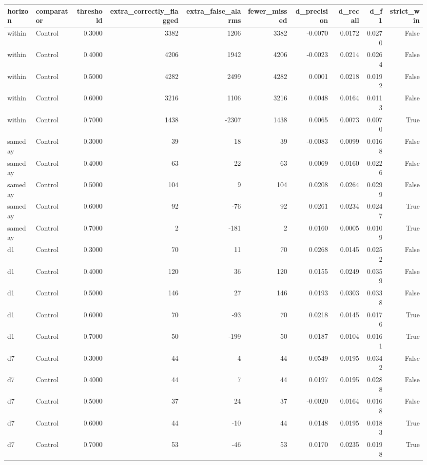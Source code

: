 \begin{tabular}{llrrrrrrrr}
\toprule
horizon & comparator & threshold & extra\_correctly\_flagged & extra\_false\_alarms & fewer\_missed & d\_precision & d\_recall & d\_f1 & strict\_win \\
\midrule
within & Control & 0.3000 & 3382 & 1206 & 3382 & -0.0070 & 0.0172 & 0.0270 & False \\
within & Control & 0.4000 & 4206 & 1942 & 4206 & -0.0023 & 0.0214 & 0.0264 & False \\
within & Control & 0.5000 & 4282 & 2499 & 4282 & 0.0001 & 0.0218 & 0.0192 & False \\
within & Control & 0.6000 & 3216 & 1106 & 3216 & 0.0048 & 0.0164 & 0.0113 & False \\
within & Control & 0.7000 & 1438 & -2307 & 1438 & 0.0065 & 0.0073 & 0.0070 & True \\
sameday & Control & 0.3000 & 39 & 18 & 39 & -0.0083 & 0.0099 & 0.0168 & False \\
sameday & Control & 0.4000 & 63 & 22 & 63 & 0.0069 & 0.0160 & 0.0226 & False \\
sameday & Control & 0.5000 & 104 & 9 & 104 & 0.0208 & 0.0264 & 0.0299 & False \\
sameday & Control & 0.6000 & 92 & -76 & 92 & 0.0261 & 0.0234 & 0.0247 & True \\
sameday & Control & 0.7000 & 2 & -181 & 2 & 0.0160 & 0.0005 & 0.0109 & True \\
d1 & Control & 0.3000 & 70 & 11 & 70 & 0.0268 & 0.0145 & 0.0252 & False \\
d1 & Control & 0.4000 & 120 & 36 & 120 & 0.0155 & 0.0249 & 0.0359 & False \\
d1 & Control & 0.5000 & 146 & 27 & 146 & 0.0193 & 0.0303 & 0.0338 & False \\
d1 & Control & 0.6000 & 70 & -93 & 70 & 0.0218 & 0.0145 & 0.0176 & True \\
d1 & Control & 0.7000 & 50 & -199 & 50 & 0.0187 & 0.0104 & 0.0161 & True \\
d7 & Control & 0.3000 & 44 & 4 & 44 & 0.0549 & 0.0195 & 0.0342 & False \\
d7 & Control & 0.4000 & 44 & 7 & 44 & 0.0197 & 0.0195 & 0.0288 & False \\
d7 & Control & 0.5000 & 37 & 24 & 37 & -0.0020 & 0.0164 & 0.0168 & False \\
d7 & Control & 0.6000 & 44 & -10 & 44 & 0.0148 & 0.0195 & 0.0183 & True \\
d7 & Control & 0.7000 & 53 & -46 & 53 & 0.0170 & 0.0235 & 0.0198 & True \\

\end{tabular}
